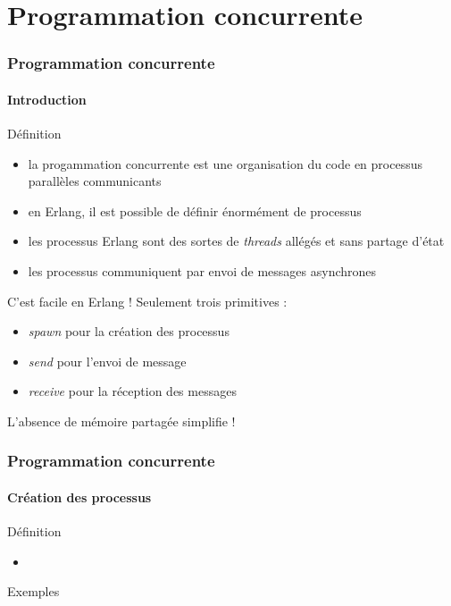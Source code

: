 \section{Programmation concurrente}

\begin{frame}
  \frametitle{Programmation concurrente}
  \framesubtitle{Introduction}

  \begin{block}{Définition}
    \begin{itemize}
    \item la progammation concurrente est une organisation du code en
      processus parallèles communicants
    \item en Erlang, il est possible de définir énormément de processus
    \item les processus Erlang sont des sortes de \textit{threads} allégés et
      sans partage d'état
    \item les processus communiquent par envoi de messages asynchrones
    \end{itemize}
  \end{block}

  \begin{alertblock}{C'est facile en Erlang !}
    Seulement trois primitives :
    \begin{itemize}
    \item \textit{spawn} pour la création des processus
    \item \textit{send} pour l'envoi de message
    \item \textit{receive} pour la réception des messages
    \end{itemize}
    L'absence de mémoire partagée simplifie !
  \end{alertblock}

\end{frame}

\begin{frame}
  \frametitle{Programmation concurrente}
  \framesubtitle{Création des processus}

  \begin{block}{Définition}
    \begin{itemize}
    \item
    \end{itemize}
  \end{block}

  \begin{exampleblock}{Exemples}
  \end{exampleblock}

\end{frame}

